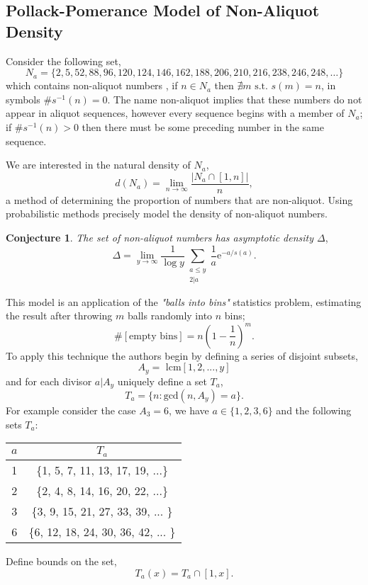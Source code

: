\documentclass{article}
\theoremstyle{definition}
\newtheorem{conjecture}{Conjecture}[section]
\begin{document}
\subsection{Pollack-Pomerance Model of Non-Aliquot Density}
Consider the following set,
$$N_a = \{2,5,52,88,96,120,124,146,162,188,206,210,216,238,246,248, \dots\}$$
which contains non-aliquot numbers \cite{sloane_2022}, if $n \in N_a$ then $\nexists m \text{ s.t. } s(m) = n$, in symbols $\#s^{-1}(n) = 0$. The name non-aliquot implies that these numbers do not appear in aliquot sequences, however every sequence begins with a member of $N_a$; if $\#s^{-1}(n) > 0$ then there must be some preceding number in the same sequence.

We are interested in the natural density of $N_a$,
$$d(N_a) = \lim_{n \to \infty}\frac{|N_a \cap[1,n]|}{n},$$
a method of determining the proportion of numbers that are non-aliquot. Using probabilistic methods \cite{pollPom} precisely model the density of non-aliquot numbers.
\begin{conjecture}{\textit{The set of non-aliquot numbers has asymptotic density $\Delta$},}
    $$\Delta = \lim_{y \to \infty}\frac{1}{\log y} \sum_{\substack{a\leq y \\ 2 | a}} \frac{1}{a}\text{e}^{-a/s(a)}.$$
\end{conjecture}

This model is an application of the \textit{"balls into bins"} statistics problem, estimating the result after throwing $m$ balls randomly into $n$ bins;
$$\#[\text{empty bins}] = n(1- \frac{1}{n})^m.$$
To apply this technique the authors begin by defining a series of disjoint subsets,
$$A_y = \text{ lcm}[1, 2, ..., y]$$
and for each divisor $a | A_y$ uniquely define a set $T_a$,
$$T_a = \{n : \text{gcd}(n, A_y) = a\}.$$
For example consider the case $A_3 = 6$, we have $a \in \{1,2,3,6\}$ and the following sets $T_a$:
\begin{center}
    \begin{tabular}{ |c|c|}
        \hline
        $a$ & $T_a$                               \\
        \hline
        1   & \{1, 5, 7, 11, 13, 17, 19, ...\}    \\
        \hline
        2   & \{2, 4, 8, 14, 16, 20, 22, ...\}    \\
        \hline
        3   & \{3, 9, 15, 21, 27, 33, 39, ...  \} \\
        \hline
        6   & \{6, 12, 18, 24, 30, 36, 42, ... \} \\
        \hline
    \end{tabular}
\end{center}
Define bounds on the set,
$$T_a(x) = T_a \cap [1,x].$$
\end{document}
